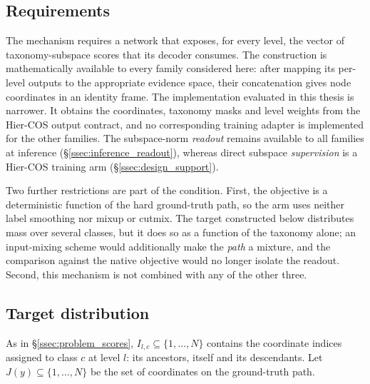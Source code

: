 \subsection{Requirements}
\label{ssec:subspace_setting}

The mechanism requires a network that exposes, for every level, the vector of
taxonomy-subspace scores that its decoder consumes. The construction is
mathematically available to every family considered here: after mapping its
per-level outputs to the appropriate evidence space, their concatenation gives
node coordinates in an identity frame. The implementation evaluated in this
thesis is narrower. It obtains the coordinates, taxonomy masks and level weights
from the Hier-COS output contract, and no corresponding training adapter is
implemented for the other families. The subspace-norm \emph{readout} remains
available to all families at inference (\S\ref{ssec:inference_readout}), whereas
direct subspace \emph{supervision} is a Hier-COS training arm
(\S\ref{ssec:design_support}).

Two further restrictions are part of the condition. First, the objective is a deterministic function of the hard
ground-truth path, so the arm uses neither label smoothing nor mixup or cutmix.
The target constructed below distributes mass over several classes, but it does
so as a function of the taxonomy alone; an input-mixing scheme would additionally
make the \emph{path} a mixture, and the comparison against the native objective
would no longer isolate the readout. Second, this mechanism is not combined with
any of the other three.

\subsection{Target distribution}
\label{ssec:subspace_objective}

As in \S\ref{ssec:problem_scores}, $I_{l,c}\subseteq\{1,\dots,N\}$ contains
the coordinate indices assigned to class $c$ at level $l$: its ancestors,
itself and its descendants. Let $J(y)\subseteq\{1,\dots,N\}$ be the set of
coordinates on the ground-truth path.

